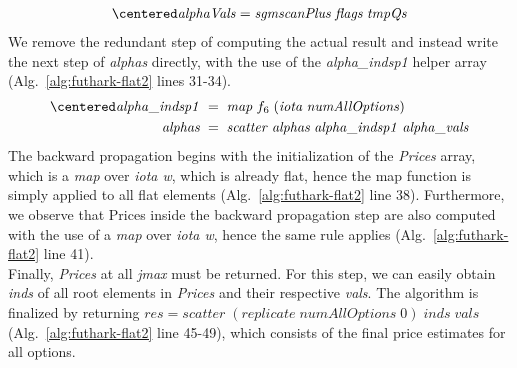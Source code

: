 \begin{align}
\centered
\nonumber
\mathit{alphaVals} = \mathit{sgmscanPlus}\;\mathit{flags}\;\mathit{tmpQs}
\end{align}
We remove the redundant step of computing the actual  result and instead write the next step of \textit{alphas} directly, with the use of the \textit{alpha\_indsp1} helper array (Alg.~\ref{alg:futhark-flat2} lines 31-34). 
\begin{align}
\centered
\nonumber \mathit{alpha\_indsp1}\;&=\;\mathit{map}\;f_6\;(\mathit{iota}\;\mathit{numAllOptions})\\
\nonumber \mathit{alphas}\;&=\;\mathit{scatter}\;\mathit{alphas}\;\mathit{alpha\_indsp1}\;\mathit{alpha\_vals}
\end{align}
The backward propagation begins with the initialization of the \textit{Prices} array, which is a \textit{map} over \textit{iota w}, which is already flat, hence the map function is simply applied to all flat elements (Alg.~\ref{alg:futhark-flat2} line 38). Furthermore, we observe that Prices inside the backward propagation step are also computed with the use of a \textit{map} over \textit{iota w}, hence the same rule applies (Alg.~\ref{alg:futhark-flat2} line 41).
\\
Finally, \textit{Prices} at all \textit{jmax} must be returned. For this step, we can easily obtain \textit{inds} of all root elements in \textit{Prices} and their respective \textit{vals}. The algorithm is finalized by returning $\mathit{res} = \mathit{scatter}\;(\mathit{replicate}\;\mathit{numAllOptions}\;0)\;\mathit{inds}\;\mathit{vals}$ (Alg.~\ref{alg:futhark-flat2} line 45-49), which consists of the final price estimates for all options. 



